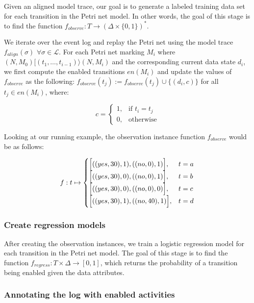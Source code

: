 Given an aligned model trace, our goal is to generate a labeled training data set for each transition in the Petri net model. In other words, the goal of this stage is to find the function $f_{observe}: T \rightarrow (\Delta \times \{0, 1\})^*$.

We iterate over the event log and replay the Petri net using the model trace $f_{align}(\sigma)$ $\forall \sigma \in \mathcal{L}$. For each Petri net marking $M_i$ where $(N, M_0)[(t_1, \dots, t_{i-1}) \rangle (N, M_i)$ and the corresponding current data state $d_i$, we first compute the enabled transitions $en(M_i)$ and update the values of $f_{observe}$ as the following:
$f_{observe}(t_j) := f_{observe}(t_j) \cup \{ (d_i, c)\}$ for all $t_j \in en(M_i)$, where:

\[
    c =
    \begin{cases}
        1, & \text{if } t_i = t_j\\
        0, & \text{otherwise}
    \end{cases}
\]

Looking at our running example, the observation instance function $f_{observe}$ would be as follows:

\[
    f: t \mapsto
    \begin{cases}
        \Bigl[((yes, 30), 1), ((no, 0), 1) \Bigr], & t = a\\
        \Bigl[((yes, 30), 0), ((no, 0), 1)\Bigr], & t = b\\
        \Bigl[((yes, 30), 0), ((no, 0), 0)\Bigr], & t = c\\
        \Bigl[ ((yes, 30), 1), ((no, 40), 1)\Bigr], & t = d\\
    \end{cases}
\]

\subsubsection*{Create regression models}

After creating the observation instances, we train a logistic regression model for each transition in the Petri net model. The goal of this stage is to find the function $f_{regress}: T \times \Delta \rightarrow [0 , 1]$, which returns the probability of a transition being enabled given the data attributes.

\subsubsection*{Annotating the log with enabled activities}

